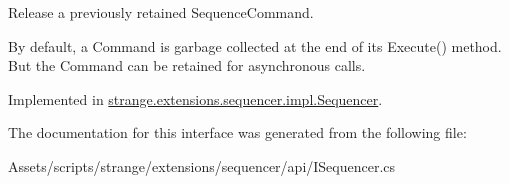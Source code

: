 Release a previously retained Sequence\-Command. 

By default, a Command is garbage collected at the end of its {\ttfamily Execute()} method. But the Command can be retained for asynchronous calls. 

Implemented in \hyperlink{classstrange_1_1extensions_1_1sequencer_1_1impl_1_1_sequencer_a3bd35c4eb952086f159831612b13ce74}{strange.\-extensions.\-sequencer.\-impl.\-Sequencer}.



The documentation for this interface was generated from the following file\-:\begin{DoxyCompactItemize}
\item 
Assets/scripts/strange/extensions/sequencer/api/I\-Sequencer.\-cs\end{DoxyCompactItemize}
